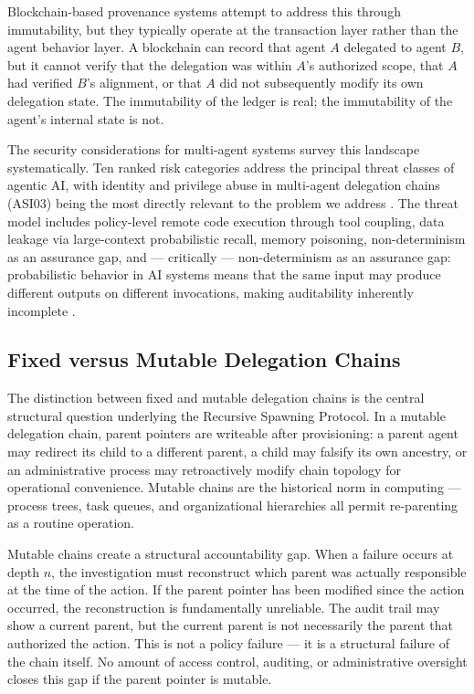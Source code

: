 Blockchain-based provenance systems attempt to address this through immutability, but they typically operate at the transaction layer rather than the agent behavior layer. A blockchain can record that agent $A$ delegated to agent $B$, but it cannot verify that the delegation was within $A$'s authorized scope, that $A$ had verified $B$'s alignment, or that $A$ did not subsequently modify its own delegation state. The immutability of the ledger is real; the immutability of the agent's internal state is not.

The security considerations for multi-agent systems survey this landscape systematically. Ten ranked risk categories address the principal threat classes of agentic AI, with identity and privilege abuse in multi-agent delegation chains (ASI03) being the most directly relevant to the problem we address \cite{security2025}. The threat model includes policy-level remote code execution through tool coupling, data leakage via large-context probabilistic recall, memory poisoning, non-determinism as an assurance gap, and — critically — non-determinism as an assurance gap: probabilistic behavior in AI systems means that the same input may produce different outputs on different invocations, making auditability inherently incomplete \cite{security2025}.

\subsection{Fixed versus Mutable Delegation Chains}
\label{sec:fixed-vs-mutable-chains}

The distinction between fixed and mutable delegation chains is the central structural question underlying the Recursive Spawning Protocol. In a mutable delegation chain, parent pointers are writeable after provisioning: a parent agent may redirect its child to a different parent, a child may falsify its own ancestry, or an administrative process may retroactively modify chain topology for operational convenience. Mutable chains are the historical norm in computing — process trees, task queues, and organizational hierarchies all permit re-parenting as a routine operation.

Mutable chains create a structural accountability gap. When a failure occurs at depth $n$, the investigation must reconstruct which parent was actually responsible at the time of the action. If the parent pointer has been modified since the action occurred, the reconstruction is fundamentally unreliable. The audit trail may show a current parent, but the current parent is not necessarily the parent that authorized the action. This is not a policy failure — it is a structural failure of the chain itself. No amount of access control, auditing, or administrative oversight closes this gap if the parent pointer is mutable.


